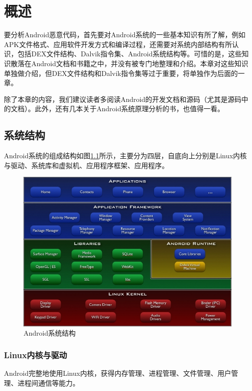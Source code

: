 \chapter{概述}
要分析Android恶意代码，首先要对Android系统的一些基本知识有所了解，例如APK文件格式、应用软件开发方式和编译过程，还需要对系统内部结构有所认识，包括DEX文件结构、Dalvik指令集、Android系统结构等。可惜的是，这些知识散落在Android文档和书籍之中，并没有被专门地整理和介绍。本章对这些知识单独做介绍，但DEX文件结构和Dalvik指令集等过于重要，将单独作为后面的一章。

除了本章的内容，我们建议读者多阅读Android的开发文档和源码（尤其是源码中的文档）。此外，还有几本关于Android系统原理分析的书\cite{android_jishuneimu, android_shenrulijie, android_neihepouxi}，也值得一看。
\section{系统结构}
Android系统的组成结构如图\ref{Fig:system-architecture}所示，主要分为四层，自底向上分别是Linux内核与驱动、系统库和虚拟机、应用程序框架、应用程序。
\begin{figure}[htbp]
  \centering
  \includegraphics[width=14cm]{image/system-architecture.jpg}
  \caption{Android系统结构}
  \label{Fig:system-architecture}
\end{figure}

\subsection{Linux内核与驱动}
Android完整地使用Linux内核，获得内存管理、进程管理、文件管理、用户管理、进程间通信等能力。


